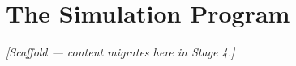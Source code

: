 \chapter{The Simulation Program}
\label{chap:sims}


\noindent\emph{[Scaffold --- content migrates here in Stage 4.]}
